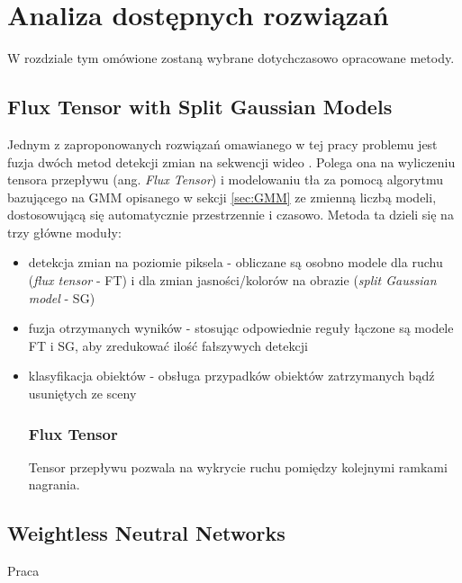 \chapter{Analiza dostępnych rozwiązań}
\label{cha:analiza}

W rozdziale tym omówione zostaną wybrane dotychczasowo opracowane metody.


\section{Flux Tensor with Split Gaussian Models}
\label{sec:FTSG}

Jednym z zaproponowanych rozwiązań omawianego w tej pracy problemu jest fuzja dwóch metod detekcji zmian na sekwencji wideo \cite{6910016}. Polega ona na wyliczeniu tensora przepływu (ang. \textit{Flux Tensor}) i modelowaniu tła za pomocą algorytmu bazującego na GMM opisanego w sekcji \ref{sec:GMM} ze zmienną liczbą modeli, dostosowującą się automatycznie przestrzennie i czasowo.
Metoda ta dzieli się na trzy główne moduły:
\begin{itemize}
\item
detekcja zmian na poziomie piksela - obliczane są osobno modele dla ruchu (\textit{flux tensor} - FT) i dla zmian jasności/kolorów na obrazie (\textit{split Gaussian model} - SG)
\item
fuzja otrzymanych wyników - stosując odpowiednie reguły łączone są modele FT i SG, aby zredukować ilość fałszywych detekcji
\item
klasyfikacja obiektów - obsługa przypadków obiektów zatrzymanych bądź usuniętych ze sceny
\subsection{Flux Tensor}
Tensor przepływu pozwala na wykrycie ruchu pomiędzy kolejnymi ramkami nagrania. 
\end{itemize}
\section{Weightless Neutral Networks}
Praca \cite{6910014}
